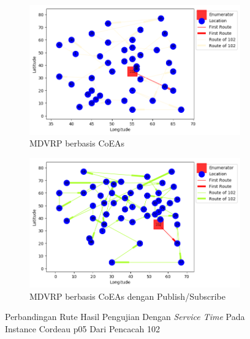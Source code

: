 \begin{figure}[H]
	\centering
	\begin{subfigure}[t]{\textwidth}
		\centering
		\includegraphics[width=\textwidth]{Resources/Images/cordeau_p05_tw/cordeau_p05_tw_102_coes}
		\caption{MDVRP berbasis CoEAs}
		\label{fig:cordeau_p05_tw_102_coes}
	\end{subfigure}
	\begin{subfigure}[t]{\textwidth}
		\centering
		\includegraphics[width=\textwidth]{Resources/Images/cordeau_p05_tw/cordeau_p05_tw_102_pubsub_coes}
		\caption{MDVRP berbasis CoEAs dengan Publish/Subscribe}
		\label{fig:cordeau_p05_tw_102_pubsub_coes}
	\end{subfigure}
	\caption{Perbandingan Rute Hasil Pengujian Dengan \textit{Service Time} Pada Instance Cordeau p05 Dari Pencacah 102}
	\label{fig:cordeau_p05_tw_102}
\end{figure}


